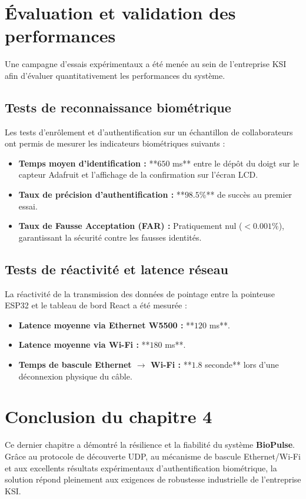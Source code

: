 \documentclass[12pt,a4paper]{report}
\begin{document}
\section{Évaluation et validation des performances}
Une campagne d'essais expérimentaux a été menée au sein de l'entreprise KSI afin d'évaluer quantitativement les performances du système.

\subsection{Tests de reconnaissance biométrique}
Les tests d'enrôlement et d'authentification sur un échantillon de collaborateurs ont permis de mesurer les indicateurs biométriques suivants :
\begin{itemize}
    \item \textbf{Temps moyen d'identification :} **$650$ ms** entre le dépôt du doigt sur le capteur Adafruit et l'affichage de la confirmation sur l'écran LCD.
    \item \textbf{Taux de précision d'authentification :} **$98.5\%$** de succès au premier essai.
    \item \textbf{Taux de Fausse Acceptation (FAR) :} Pratiquement nul ($< 0.001\%$), garantissant la sécurité contre les fausses identités.
\end{itemize}

\subsection{Tests de réactivité et latence réseau}
La réactivité de la transmission des données de pointage entre la pointeuse ESP32 et le tableau de bord React a été mesurée :
\begin{itemize}
    \item \textbf{Latence moyenne via Ethernet W5500 :} **$120$ ms**.
    \item \textbf{Latence moyenne via Wi-Fi :} **$180$ ms**.
    \item \textbf{Temps de bascule Ethernet $\rightarrow$ Wi-Fi :} **$1.8$ seconde** lors d'une déconnexion physique du câble.
\end{itemize}

\section{Conclusion du chapitre 4}
Ce dernier chapitre a démontré la résilience et la fiabilité du système \textbf{BioPulse}. Grâce au protocole de découverte UDP, au mécanisme de bascule Ethernet/Wi-Fi et aux excellents résultats expérimentaux d'authentification biométrique, la solution répond pleinement aux exigences de robustesse industrielle de l'entreprise KSI.
\end{document}
